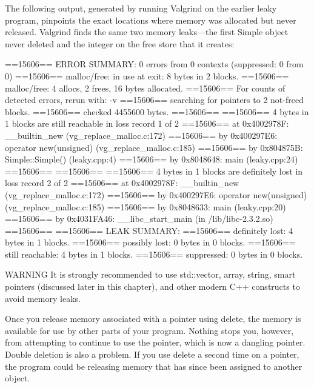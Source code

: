The following output, generated by running Valgrind on the earlier leaky program, pinpoints the exact locations where memory was allocated but never released. Valgrind finds the same two memory leaks—the first Simple object never deleted and the integer on the free store that it creates:

\begin{shell}
==15606== ERROR SUMMARY: 0 errors from 0 contexts (suppressed: 0 from 0)
==15606== malloc/free: in use at exit: 8 bytes in 2 blocks.
==15606== malloc/free: 4 allocs, 2 frees, 16 bytes allocated.
==15606== For counts of detected errors, rerun with: -v
==15606== searching for pointers to 2 not-freed blocks.
==15606== checked 4455600 bytes.
==15606==
==15606== 4 bytes in 1 blocks are still reachable in loss record 1 of 2
==15606==    at 0x4002978F: __builtin_new (vg_replace_malloc.c:172)
==15606==    by 0x400297E6: operator new(unsigned) (vg_replace_malloc.c:185)
==15606==    by 0x804875B: Simple::Simple() (leaky.cpp:4)
==15606==    by 0x8048648: main (leaky.cpp:24)
==15606==
==15606==
==15606== 4 bytes in 1 blocks are definitely lost in loss record 2 of 2
==15606==    at 0x4002978F: __builtin_new (vg_replace_malloc.c:172)
==15606==    by 0x400297E6: operator new(unsigned) (vg_replace_malloc.c:185)
==15606==    by 0x8048633: main (leaky.cpp:20)
==15606==    by 0x4031FA46: __libc_start_main (in /lib/libc-2.3.2.so)
==15606==
==15606== LEAK SUMMARY:
==15606==     definitely lost: 4 bytes in 1 blocks.
==15606==     possibly lost:   0 bytes in 0 blocks.
==15606==     still reachable: 4 bytes in 1 blocks.
==15606==          suppressed: 0 bytes in 0 blocks.
\end{shell}

\begin{myWarning}{WARNING}
It is strongly recommended to use std::vector, array, string, smart pointers (discussed later in this chapter), and other modern C++ constructs to avoid memory leaks.
\end{myWarning}


Once you release memory associated with a pointer using delete, the memory is available for use by other parts of your program. Nothing stops you, however, from attempting to continue to use the pointer, which is now a dangling pointer. Double deletion is also a problem. If you use delete a second time on a pointer, the program could be releasing memory that has since been assigned to another object.

